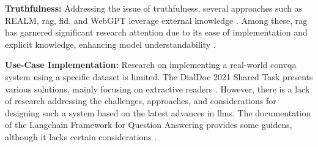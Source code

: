 \vspace{\baselineskip}
\noindent\textbf{Truthfulness:} Addressing the issue of truthfulness, several approaches such as REALM, \gls{rag}, \gls{fid}, and WebGPT leverage external knowledge \cite{guu_realm_2020, lewis_retrieval-augmented_2021, izacard_leveraging_2021, nakano_webgpt_2022}. Among these, \gls{rag} has garnered significant research attention due to its ease of implementation and explicit knowledge, enhancing model understandability \cite{gao_retrieval-augmented_2024}.

\vspace{\baselineskip}
\noindent\textbf{Use-Case Implementation:} Research on implementing a real-world \gls{convqa} system using a specific dataset is limited. The DialDoc 2021 Shared Task presents various solutions, mainly focusing on extractive readers \cite{feng_dialdoc_2021}. However, there is a lack of research addressing the challenges, approaches, and considerations for designing such a system based on the latest advances in \gls{llm}s. The documentation of the Langchain Framework for Question Answering provides some guidens, although it lacks certain considerations \cite{noauthor_question_nodate}.
